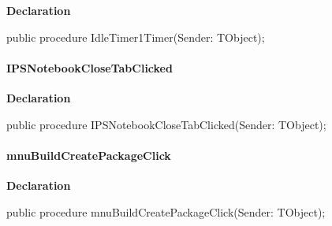 \documentclass{report}
\newif\ifpdf
\begin{document}
\label{editor.TFrmEditor-IdleTimer1Timer}
\begin{list}{}{
\setlength{\itemindent}{0cm}
\setlength{\listparindent}{0cm}
\setlength{\leftmargin}{\evensidemargin}
\addtolength{\leftmargin}{\tmplength}
\settowidth{\labelsep}{X}
\addtolength{\leftmargin}{\labelsep}
\setlength{\labelwidth}{\tmplength}
}
\item[\textbf{Declaration}\hfill]
\ifpdf
\begin{flushleft}
\fi
\begin{ttfamily}
public procedure IdleTimer1Timer(Sender: TObject);\end{ttfamily}

\ifpdf
\end{flushleft}
\fi

\end{list}
\paragraph*{IPSNotebookCloseTabClicked}\hspace*{\fill}

\label{editor.TFrmEditor-IPSNotebookCloseTabClicked}
\begin{list}{}{
\setlength{\itemindent}{0cm}
\setlength{\listparindent}{0cm}
\setlength{\leftmargin}{\evensidemargin}
\addtolength{\leftmargin}{\tmplength}
\settowidth{\labelsep}{X}
\addtolength{\leftmargin}{\labelsep}
\setlength{\labelwidth}{\tmplength}
}
\item[\textbf{Declaration}\hfill]
\ifpdf
\begin{flushleft}
\fi
\begin{ttfamily}
public procedure IPSNotebookCloseTabClicked(Sender: TObject);\end{ttfamily}

\ifpdf
\end{flushleft}
\fi

\end{list}
\paragraph*{mnuBuildCreatePackageClick}\hspace*{\fill}

\label{editor.TFrmEditor-mnuBuildCreatePackageClick}
\begin{list}{}{
\setlength{\itemindent}{0cm}
\setlength{\listparindent}{0cm}
\setlength{\leftmargin}{\evensidemargin}
\addtolength{\leftmargin}{\tmplength}
\settowidth{\labelsep}{X}
\addtolength{\leftmargin}{\labelsep}
\setlength{\labelwidth}{\tmplength}
}
\item[\textbf{Declaration}\hfill]
\ifpdf
\begin{flushleft}
\fi
\begin{ttfamily}
public procedure mnuBuildCreatePackageClick(Sender: TObject);\end{ttfamily}

\ifpdf
\end{flushleft}
\fi

\end{list}
\end{document}
